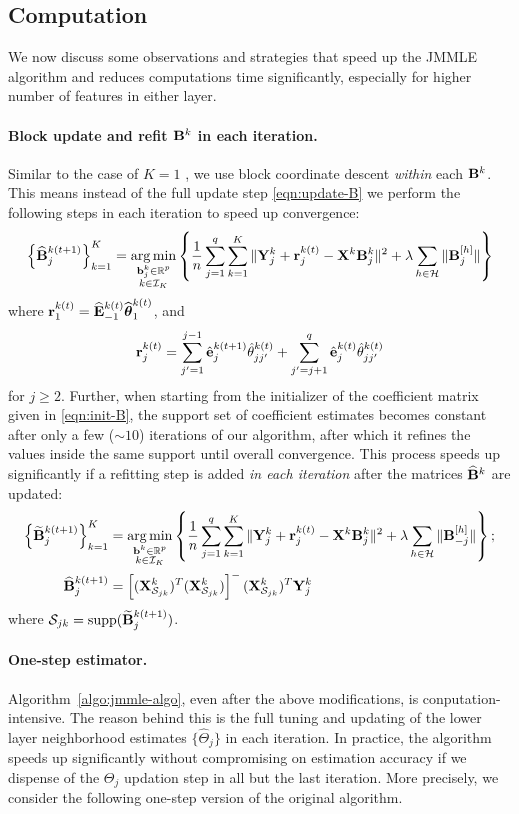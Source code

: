 \subsection{Computation}
\label{sec:tricks-jmmle}
We now discuss some observations and strategies that speed up the JMMLE algorithm and reduces computations time significantly, especially for higher number of features in either layer.

\paragraph{Block update and refit ${\mathbf{B}}^k$ in each iteration.} Similar to the case of $K=1$ \citep{LinEtal16}, we use block coordinate descent {\it within} each ${\mathbf{B}}^k$. This means instead of the full update step \eqref{eqn:update-B} we perform the following steps in each iteration to speed up convergence:
%
$$
\left\{\widehat {{\mathbf{B}}}^{k (t+1)}_j \right\}_{k=1}^K =
\operatorname*{arg\,min}_{\substack{{\bf{b}}_j^k \in {\mathbb{R}}^p\\k \in {\cal{I}}_K}} \left\{ \frac{1}{n} \sum_{j=1}^q \sum_{k=1}^K \| {\mathbf{Y}}^k_j + {\bf{r}}_j^{k (t)} - {\mathbf{X}}^k {\mathbf{B}}_j^{k } \|^2
+ \lambda \sum_{h \in {\cal{H}}} \| {\mathbf{B}}_j^{[h]} \| \right\}
$$
%
where ${\bf{r}}_1^{k (t)} = \widehat {{\mathbf{E}}}_{-1}^{k (t)} \widehat {{\boldsymbol{\theta}}}_1^{k (t)}$, and
%
$$
{\bf{r}}_j^{k (t)} = \sum_{j'=1}^{j-1} \hat {{\bf{e}}}_j^{k (t+1)} \hat \theta_{jj'}^{k (t)} +
\sum_{j'=j+1}^{q} \hat {{\bf{e}}}_j^{k (t)} \hat \theta_{jj'}^{k (t)}
$$
%
for $j \geq 2$. Further, when starting from the initializer of the coefficient matrix given in \eqref{eqn:init-B}, the support set of coefficient estimates becomes constant after only a few ($\sim 10$) iterations of our algorithm, after which it refines the values inside the same support until overall convergence. This process speeds up significantly if a refitting step is added {\it in each iteration} after the matrices $\widehat {{\mathbf{B}}}^k$ are updated:
%
\begin{align*}
\left\{\widetilde {{\mathbf{B}}}^{k (t+1)}_j \right\}_{k=1}^K &=
\operatorname*{arg\,min}_{\substack{{\bf{b}}^k \in {\mathbb{R}}^p\\k \in {\cal{I}}_K}} \left\{ \frac{1}{n} \sum_{j=1}^q \sum_{k=1}^K \| {\mathbf{Y}}^k_j + {\bf{r}}_j^{k (t)} - {\mathbf{X}}^k {\mathbf{B}}_j^{k } \|^2
+ \lambda \sum_{h \in {\cal{H}}} \| {\mathbf{B}}^{[h]}_{-j} \| \right\}; \\
\widehat {{\mathbf{B}}}^{k (t+1)}_j &= \left[ ({\mathbf{X}}_{{\cal{S}}_{jk}}^k)^T ({\mathbf{X}}_{{\cal{S}}_{jk}}^k) \right]^- ({\mathbf{X}}_{{\cal{S}}_{jk}}^k)^T {\mathbf{Y}}_j^k
\end{align*}
%
where ${\cal{S}}_{jk} = \operatorname*{supp}(\widetilde {{\mathbf{B}}}^{k (t+1)}_j)$.

\paragraph{One-step estimator.} Algorithm~\ref{algo:jmmle-algo}, even after the above modifications, is conputation-intensive. The reason behind this is the full tuning and updating of the lower layer neighborhood estimates $\{ \widehat \Theta_j \}$ in each iteration. In practice, the algorithm speeds up significantly without compromising on estimation accuracy if we dispense of the $\Theta_j$ updation step in all but the last iteration. More precisely, we consider the following one-step version of the original algorithm.

